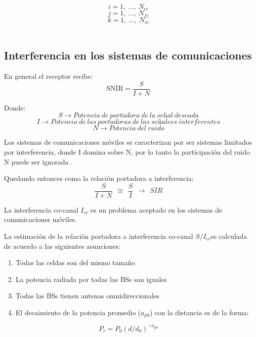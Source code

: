 \[i=1,\ \dots ,\ N_{cc}\] 
\[j=1,\ \dots ,\ N_{fc}\] 
\[k=1,\ \dots ,\ N_{sc}\] \\



\subsection{Interferencia en los sistemas de comunicaciones}

En general el receptor recibe:\newline
\begin{equation}
\mathrm{SNIR=}\frac{S}{I+N}
\label{eqn:SNIR}
\end{equation}

Donde:
\[S\to Potencia\ de\ portadora\ de\ la\ se\textrm{\~{n}}al\ deseada\] 
\[I\to Potencia\ de\ las\ portadoras\ de\ las\ se\textrm{\~{n}}alees\ interferentes\] 
\[N\to Potencia\ del\ ruido\] 

Los sistemas de comunicaciones móviles se caracterizan por ser sistemas limitados por interferencia, donde I domina sobre N, por lo tanto la participación del ruido N puede ser ignorada \parencite{Correia2018}.\newline

Quedando entonces como la relación portadora a interferencia:\newline
\begin{equation}
\frac{S}{I+N}\ \ \cong \ \ \frac{S}{I}\ \ \to \ \ SIR
\label{eqn:SIR}
\end{equation}

La interferencia co-canal $I_{cc}$ es un problema aceptado en los sistemas de comunicaciones móviles. \newline

La estimación de la relación portadora a interferencia co-canal ${S}/{I_{cc}}$es calculada de acuerdo  a las siguientes asunciones:

\begin{enumerate}
\item  Todas las celdas son del mismo tamaño
\item  La potencia radiada por todas las BSs son iguales
\item  Todas las BSs tienen antenas omnidireccionales
\item  El decaimiento de la potencia promedio ($a_{pd}$) con la distancia es de la forma:
\end{enumerate}
\begin{equation}
P_r=P_0{(d/d_0)}^{-a_{pd}} 
\label{eqn:P_r}
\end{equation}

